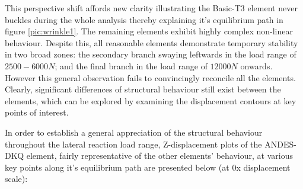 This perspective shift affords new clarity illustrating the Basic-T3 element never buckles during the whole analysis thereby explaining it's equilibrium path in figure \ref{pic:wrinkle1}. The remaining elements exhibit highly complex non-linear behaviour. Despite this, all reasonable elements demonstrate temporary stability in two broad zones: the secondary branch swaying leftwards in the load range of $2500 - 6000N$; and the final branch in the load range of $12000 N$ onwards. However this general observation fails to convincingly reconcile all the elements. Clearly, significant differences of structural behaviour still exist between the elements, which can be explored by examining the displacement contours at key points of interest.

In order to establish a general appreciation of the structural behaviour throughout the lateral reaction load range, Z-displacement plots of the ANDES-DKQ element, fairly representative of the other elements' behaviour, at various key points along it's equilibrium path are presented below (at 0x displacement scale):

